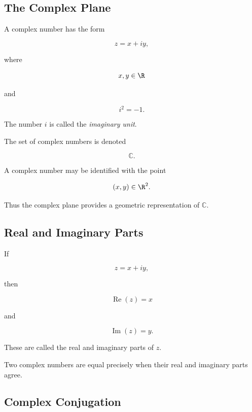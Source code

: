 \subsection{The Complex Plane}
\label{subsec:complex-plane}

A complex number has the form

\[
\boxed{
z=x+iy,
}
\]

where

\[
x,y\in\R
\]

and

\[
\boxed{
i^2=-1.
}
\]

The number \(i\) is called the \emph{imaginary unit}.

The set of complex numbers is denoted

\[
\boxed{
\mathbb{C}.
}
\]

A complex number may be identified with the point

\[
(x,y)\in\R^2.
\]

Thus the complex plane provides a geometric representation of
\(\mathbb{C}\).

\subsection{Real and Imaginary Parts}
\label{subsec:real-imaginary-parts}

If

\[
z=x+iy,
\]

then

\[
\boxed{
\operatorname{Re}(z)=x
}
\]

and

\[
\boxed{
\operatorname{Im}(z)=y.
}
\]

These are called the real and imaginary parts of \(z\).

Two complex numbers are equal precisely when their real and imaginary
parts agree.

\subsection{Complex Conjugation}
\label{subsec:complex-conjugation}

